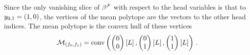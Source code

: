 \begin{example}
    Since the only vanishing slice of $\beta^{\mathcal{F}}$ with respect to the head variables is that to $y_{0,1} = (1,0)$, the vertices of the mean polytope are the vectors to the other head indices.
    The mean polytope is the convex hull of these vertices
    \begin{align*}
        \mathcal{M}_{(f_{0},f_{1})} =
        \mathrm{conv}\left(\begin{pmatrix} 
                        0 \\ 0
         \end{pmatrix}\left[L\right],
            \begin{pmatrix} 
                0 \\ 1
             \end{pmatrix}\left[L\right],
            \begin{pmatrix} 
                1 \\ 1
             \end{pmatrix}\left[L\right]\right) \, .
    \end{align*}


\end{example}
